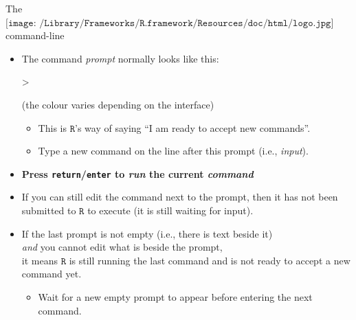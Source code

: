 \documentclass[
  11pt,
  ignorenonframetext,
]{beamer}
\newenvironment{Shaded}{\begin{snugshade}}{\end{snugshade}}
\newcommand{\AlertTok}[1]{\textcolor[rgb]{0.94,0.16,0.16}{#1}}
\newcommand{\NormalTok}[1]{#1}
\providecommand{\tightlist}{%
  \setlength{\itemsep}{0pt}\setlength{\parskip}{0pt}}
\begin{document}
\begin{frame}[fragile]{The
\(\texttt{[image: /Library/Frameworks/R.framework/Resources/doc/html/logo.jpg]}\)
command-line}
\protect\hypertarget{the-includegraphicsheight1emlibraryframeworksr.frameworkresourcesdochtmllogo.jpg-command-line}{}
\begin{itemize}
\item
  The command \emph{prompt} normally looks like this:

\begin{Shaded}
\begin{Highlighting}[]
\NormalTok{\textgreater{}}
\end{Highlighting}
\end{Shaded}

  {\footnotesize (the colour varies depending on the interface)}

  \begin{itemize}
  \tightlist
  \item
    This is \(\texttt{R}\)'s way of saying ``I am ready to accept new
    commands''.
  \item
    Type a new command on the line after this prompt (i.e.,
    \emph{input}).
  \end{itemize}
\item
  \textbf{Press \AlertTok{\texttt{return}}/\AlertTok{\texttt{enter}} to
  \emph{run} the current \emph{command} }
\item
  If you can still edit the command next to the prompt, then it has not
  been submitted to \(\texttt{R}\) to execute (it is still waiting for
  input).
\item
  If the last prompt is not empty (i.e., there is text beside it)\\
  \emph{and} you cannot edit what is beside the prompt,\\
  it means \(\texttt{R}\) is still running the last command and is not
  ready to accept a new command yet.

  \begin{itemize}
  \tightlist
  \item
    Wait for a new empty prompt to appear before entering the next
    command.
  \end{itemize}
\end{itemize}
\end{frame}
\end{document}
